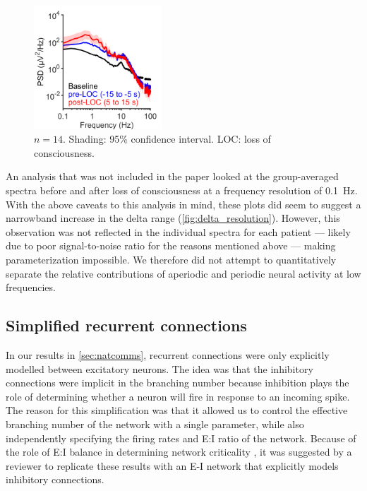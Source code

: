 \begin{figure}
\vspace{-19pt}
\centering
\includegraphics[width=48mm]{Figures/Discussion/delta_rhythms.png}
\vspace{-9pt}
\caption[High resolution spectra]{ $n=14$. Shading: 95\% confidence interval. LOC: loss of consciousness.} \label{fig:delta_resolution}
\end{figure}

An analysis that was not included in the paper looked at the group-averaged spectra before and after loss of consciousness at a frequency resolution of \qty{0.1}{\hertz}. With the above caveats to this analysis in mind, these plots did seem to suggest a narrowband increase in the delta range (\autoref{fig:delta_resolution}). However, this observation was not reflected in the individual spectra for each patient --- likely due to poor signal-to-noise ratio for the reasons mentioned above –-- making parameterization impossible. We therefore did not attempt to quantitatively separate the relative contributions of aperiodic and periodic neural activity at low frequencies.

\subsection{Simplified recurrent connections}
In our results in \autoref{sec:natcomms}, recurrent connections were only explicitly modelled between excitatory neurons. The idea was that the inhibitory connections were implicit in the branching number because inhibition plays the role of determining whether a neuron will fire in response to an incoming spike. The reason for this simplification was that it allowed us to control the effective branching number of the network with a single parameter, while also independently specifying the firing rates and E:I ratio of the network. Because of the role of E:I balance in determining network criticality \cite{Lombardi2017}, it was suggested by a reviewer to replicate these results with an E-I network that explicitly models inhibitory connections. 

